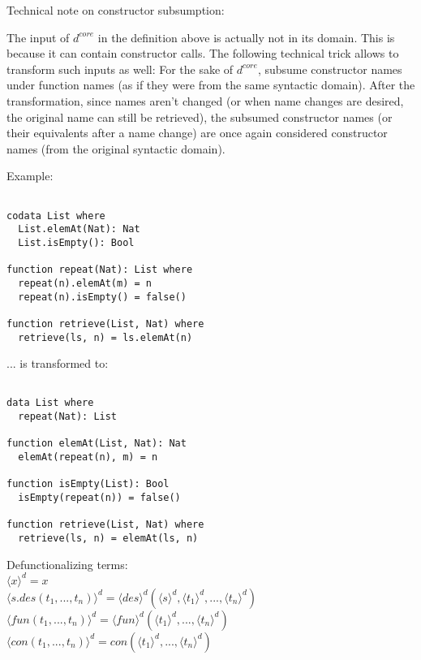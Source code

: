 \documentclass[11pt]{article} %
\begin{document}
Technical note on constructor subsumption:

The input of $d^{core}$ in the definition above is actually not in its domain. This is because it can contain constructor calls. The following technical trick allows to transform such inputs as well: For the sake of $d^{core}$, subsume constructor names under function names (as if they were from the same syntactic domain). After the transformation, since names aren't changed (or when name changes are desired, the original name can still be retrieved), the subsumed constructor names (or their equivalents after a name change) are once again considered constructor names (from the original syntactic domain).

Example:

\begin{lstlisting}

codata List where
  List.elemAt(Nat): Nat
  List.isEmpty(): Bool

function repeat(Nat): List where
  repeat(n).elemAt(m) = n
  repeat(n).isEmpty() = false()

function retrieve(List, Nat) where
  retrieve(ls, n) = ls.elemAt(n)

\end{lstlisting}

... is transformed to:

\begin{lstlisting}

data List where
  repeat(Nat): List

function elemAt(List, Nat): Nat
  elemAt(repeat(n), m) = n

function isEmpty(List): Bool
  isEmpty(repeat(n)) = false()

function retrieve(List, Nat) where
  retrieve(ls, n) = elemAt(ls, n)

\end{lstlisting}

Defunctionalizing terms: \\
$\langle x \rangle^d = x$ \\
$\langle s.des(t_1, ..., t_n) \rangle^d = \langle des \rangle^d (\langle s \rangle^d, \langle t_1 \rangle^d, ..., \langle t_n \rangle^d)$ \\
$\langle fun(t_1, ..., t_n) \rangle^d = \langle fun \rangle^d (\langle t_1 \rangle^d, ..., \langle t_n \rangle^d)$ \\
$\langle con(t_1, ..., t_n) \rangle^d = con(\langle t_1 \rangle^d, ..., \langle t_n \rangle^d)$ \\
\end{document}
